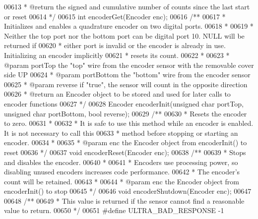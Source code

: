 \begin{DoxyCode}
00613 \textcolor{comment}{ * @return the signed and cumulative number of counts since the last start or reset}
00614 \textcolor{comment}{ */}
00615 \textcolor{keywordtype}{int} encoderGet(Encoder enc);
00616 \textcolor{comment}{/**}
00617 \textcolor{comment}{ * Initializes and enables a quadrature encoder on two digital ports.}
00618 \textcolor{comment}{ *}
00619 \textcolor{comment}{ * Neither the top port nor the bottom port can be digital port 10. NULL will be returned if}
00620 \textcolor{comment}{ * either port is invalid or the encoder is already in use. Initializing an encoder implicitly}
00621 \textcolor{comment}{ * resets its count.}
00622 \textcolor{comment}{ *}
00623 \textcolor{comment}{ * @param portTop the "top" wire from the encoder sensor with the removable cover side UP}
00624 \textcolor{comment}{ * @param portBottom the "bottom" wire from the encoder sensor}
00625 \textcolor{comment}{ * @param reverse if "true", the sensor will count in the opposite direction}
00626 \textcolor{comment}{ * @return an Encoder object to be stored and used for later calls to encoder functions}
00627 \textcolor{comment}{ */}
00628 Encoder encoderInit(\textcolor{keywordtype}{unsigned} \textcolor{keywordtype}{char} portTop, \textcolor{keywordtype}{unsigned} \textcolor{keywordtype}{char} portBottom, \textcolor{keywordtype}{bool} reverse);
00629 \textcolor{comment}{/**}
00630 \textcolor{comment}{ * Resets the encoder to zero.}
00631 \textcolor{comment}{ *}
00632 \textcolor{comment}{ * It is safe to use this method while an encoder is enabled. It is not necessary to call this}
00633 \textcolor{comment}{ * method before stopping or starting an encoder.}
00634 \textcolor{comment}{ *}
00635 \textcolor{comment}{ * @param enc the Encoder object from encoderInit() to reset}
00636 \textcolor{comment}{ */}
00637 \textcolor{keywordtype}{void} encoderReset(Encoder enc);
00638 \textcolor{comment}{/**}
00639 \textcolor{comment}{ * Stops and disables the encoder.}
00640 \textcolor{comment}{ *}
00641 \textcolor{comment}{ * Encoders use processing power, so disabling unused encoders increases code performance.}
00642 \textcolor{comment}{ * The encoder's count will be retained.}
00643 \textcolor{comment}{ *}
00644 \textcolor{comment}{ * @param enc the Encoder object from encoderInit() to stop}
00645 \textcolor{comment}{ */}
00646 \textcolor{keywordtype}{void} encoderShutdown(Encoder enc);
00647 
00648 \textcolor{comment}{/**}
00649 \textcolor{comment}{ * This value is returned if the sensor cannot find a reasonable value to return.}
00650 \textcolor{comment}{ */}
00651 \textcolor{preprocessor}{#}\textcolor{preprocessor}{define} \textcolor{preprocessor}{ULTRA\_BAD\_RESPONSE} \textcolor{preprocessor}{-}1

\end{DoxyCode}
